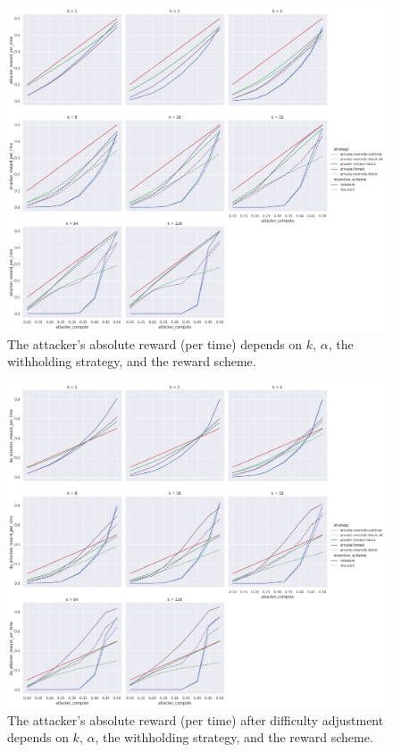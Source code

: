 \documentclass{article}
\begin{document}
\begin{figure}
  \includegraphics[width=\linewidth]{fig/withholding_absolute}
  \caption{
    The attacker's absolute reward (per time) depends on $k$, $\alpha$, the withholding strategy, and the reward scheme.
  }
  \label{fig:withholding_absolute}
\end{figure}

\begin{figure}
  \includegraphics[width=\linewidth]{fig/withholding_daa}
  \caption{
    The attacker's absolute reward (per time) after difficulty adjustment depends on $k$, $\alpha$, the withholding strategy, and the reward scheme.
  }
  \label{fig:withholding_daa}
\end{figure}
\end{document}
